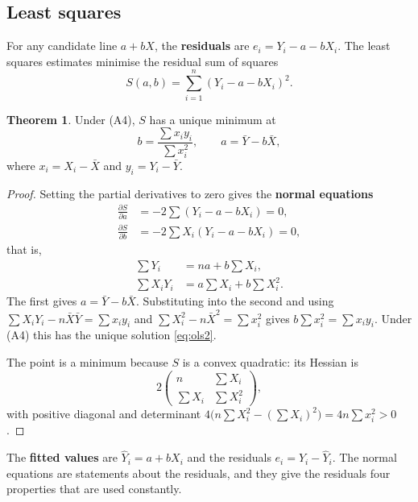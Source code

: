 \documentclass[11pt,a4paper]{article}
\numberwithin{equation}{section}
\theoremstyle{definition}
\newtheorem{thm}{Theorem}[subsection]
\begin{document}
\subsection{Least squares}
\label{ssec:ls2}

For any candidate line $a + bX$, the \textbf{residuals} are $e_i = Y_i - a - bX_i$. The least squares estimates minimise the residual sum of
squares
\[
S(a, b) = \sum_{i=1}^n (Y_i - a - bX_i)^2 .
\]

\begin{thm}
\label{thm:ols2}
Under (A4), $S$ has a unique minimum at
\begin{equation}
\label{eq:ols2}
b = \frac{\sum x_i y_i}{\sum x_i^2}, \qquad a = \bar Y - b\bar X ,
\end{equation}
where $x_i = X_i - \bar X$ and $y_i = Y_i - \bar Y$.
\end{thm}

\begin{proof}
Setting the partial derivatives to zero gives the \textbf{normal equations}
\begin{align*}
\frac{\partial S}{\partial a} &= -2\sum (Y_i - a - bX_i) = 0 ,\\
\frac{\partial S}{\partial b} &= -2\sum X_i(Y_i - a - bX_i) = 0 ,
\end{align*}
that is,
\begin{align*}
\sum Y_i &= na + b\sum X_i ,\\
\sum X_iY_i &= a\sum X_i + b\sum X_i^2 .
\end{align*}
The first gives $a = \bar Y - b\bar X$. Substituting into the second and using
$\sum X_iY_i - n\bar X\bar Y = \sum x_iy_i$ and $\sum X_i^2 - n\bar X^2 = \sum x_i^2$ gives $b\sum x_i^2 = \sum x_iy_i$. Under (A4) this has the unique
solution \eqref{eq:ols2}.

The point is a minimum because $S$ is a convex quadratic: its Hessian is
\[
2\begin{pmatrix} n & \sum X_i \\ \sum X_i & \sum X_i^2 \end{pmatrix},
\]
with positive diagonal and determinant $4\bigl(n\sum X_i^2 - (\sum X_i)^2\bigr) = 4n\sum x_i^2 > 0$.
\end{proof}

The \textbf{fitted values} are $\hat Y_i = a + bX_i$ and the residuals $e_i = Y_i - \hat Y_i$. The normal equations are statements about the
residuals, and they give the residuals four properties that are used constantly.
\end{document}
